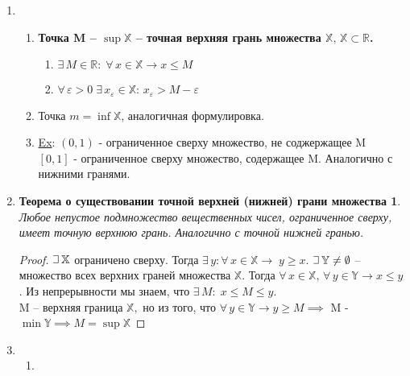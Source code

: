 \documentclass{article}
\theoremstyle{plain}
\def\letus{%
    \mathord{\setbox0=\hbox{$\exists$}%
             \hbox{\kern 0.125\wd0%
                   \vbox to \ht0{%
                      \hrule width 0.75\wd0%
                      \vfill%
                      \hrule width 0.75\wd0}%
                   \vrule height \ht0%
                   \kern 0.125\wd0}%
           }%
}
\begin{document}
\begin{enumerate}
\begin{enumerate}
\begin{enumerate}
\begin{theorem1*}
\begin{proof}
        \end{proof}
        \end{theorem1*}
        \end{enumerate}
    \end{enumerate}
    \item \begin{enumerate}
        \item \textbf{Точка M -- $\sup{\mathbb{X}}$ -- точная верхняя грань множества $\mathbb{X},\, \mathbb{X}\subset \mathbb{R}$.}   
        \begin{enumerate}
        \item $\exists\, M\in \mathbb{R}:\; \forall\, x \in \mathbb{X} \rightarrow x \le M $
        \item $\forall\, \varepsilon > 0\;\exists\,x_{\varepsilon}\in \mathbb{X}:\, x_{\varepsilon} > M - \varepsilon$
        \end{enumerate}
        \item \textbf{$\text{Точка } m = \inf\mathbb{X}$}, аналогичная формулировка.
        \item \underline{Ex}: $(0, 1)$ - ограниченное сверху множество, не соджержащее M\\
        $[0, 1]$ - ограниченное сверху множество, содержащее M. Аналогично с нижними гранями.
    \end{enumerate}
    \item \newtheorem*{theorem2*}{Теорема о существовании точной верхней (нижней) грани множества}
    \begin{theorem2*}
    Любое непустое подмножество вещественных чисел, ограниченное сверху, имеет точную верхнюю грань. Аналогично с точной нижней гранью.
    \end{theorem2*}
    \begin{proof}
    $\letus{}\, \mathbb{X}$ ограничено сверху. Тогда $\exists\, y: \forall\, x\in\mathbb{X}\rightarrow\; y \ge x$.
    $\letus{}\,\mathbb{Y} \ne \emptyset$ -- множество всех верхних граней множества $\mathbb{X}$. Тогда $\forall\,x\in\mathbb{X},\, \forall\,y\in\mathbb{Y}\rightarrow x \le y$. Из непрерывности мы знаем, что $\exists\, M:\; x\le M \le y.$\\
    M -- верхняя граница $\mathbb{X},$ но из того, что $\forall\,y\in\mathbb{Y} \rightarrow y \ge M\implies$ M - $\min{\mathbb{Y}}\implies M = \sup{\mathbb{X}}$
    \end{proof}
    \item \begin{enumerate}
        \item 

\end{enumerate}
\end{enumerate}
\end{document}
